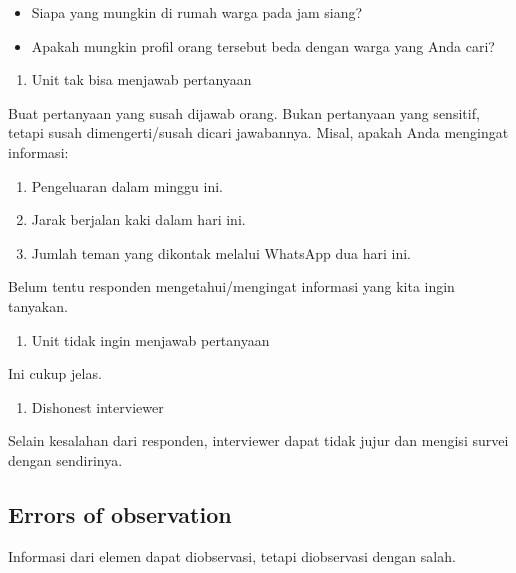 \documentclass[
  letterpaper,
  DIV=11,
  numbers=noendperiod]{scrreprt}
\providecommand{\tightlist}{%
  \setlength{\itemsep}{0pt}\setlength{\parskip}{0pt}}\usepackage{longtable,booktabs,array}
\begin{document}
\begin{itemize}
\tightlist
\item
  Siapa yang mungkin di rumah warga pada jam siang?
\item
  Apakah mungkin profil orang tersebut beda dengan warga yang Anda cari?
\end{itemize}

\begin{enumerate}
\def\labelenumi{\arabic{enumi}.}
\setcounter{enumi}{1}
\tightlist
\item
  Unit tak bisa menjawab pertanyaan
\end{enumerate}

Buat pertanyaan yang susah dijawab orang. Bukan pertanyaan yang
sensitif, tetapi susah dimengerti/susah dicari jawabannya. Misal, apakah
Anda mengingat informasi:

\begin{enumerate}
\def\labelenumi{\arabic{enumi}.}
\tightlist
\item
  Pengeluaran dalam minggu ini.
\item
  Jarak berjalan kaki dalam hari ini.
\item
  Jumlah teman yang dikontak melalui WhatsApp dua hari ini.
\end{enumerate}

Belum tentu responden mengetahui/mengingat informasi yang kita ingin
tanyakan.

\begin{enumerate}
\def\labelenumi{\arabic{enumi}.}
\setcounter{enumi}{2}
\tightlist
\item
  Unit tidak ingin menjawab pertanyaan
\end{enumerate}

Ini cukup jelas.

\begin{enumerate}
\def\labelenumi{\arabic{enumi}.}
\setcounter{enumi}{3}
\tightlist
\item
  Dishonest interviewer
\end{enumerate}

Selain kesalahan dari responden, interviewer dapat tidak jujur dan
mengisi survei dengan sendirinya.

\hypertarget{errors-of-observation}{%
\subsection{Errors of observation}\label{errors-of-observation}}

Informasi dari elemen dapat diobservasi, tetapi diobservasi dengan
salah.
\end{document}
